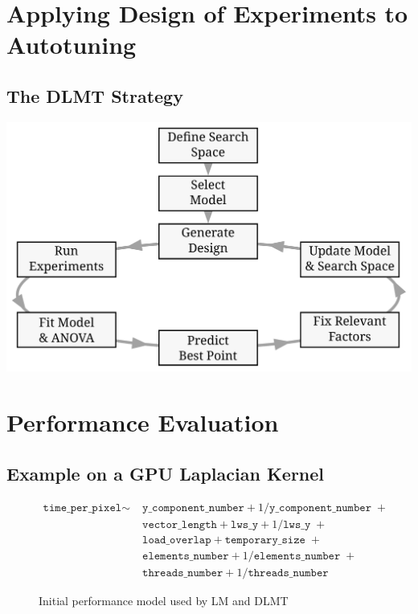 \documentclass[conference]{IEEEtran}
\begin{document}
\section{Applying Design of Experiments to Autotuning}
\label{sec:orgd139c36}
\subsection{The DLMT Strategy}
\label{sec:org52fa62d}
\begin{center}
\begin{center}
\includegraphics[width=.8\columnwidth]{./img/doe_anova_strategy.pdf}
\end{center}
\end{center}
\section{Performance Evaluation}
\label{sec:org8698b22}
\subsection{Example on a GPU Laplacian Kernel}
\label{sec:org827a55c}
\begin{figure}
{\scriptsize
\begin{align*}
\texttt{time\_per\_pixel} \sim & \; \texttt{y\_component\_number} + 1 / \texttt{y\_component\_number} \; + \\
& \; \texttt{vector\_length} + \texttt{lws\_y} + 1 / \texttt{lws\_y} \; + \\
& \; \texttt{load\_overlap} + \texttt{temporary\_size} \; + \\
& \; \texttt{elements\_number} + 1 / \texttt{elements\_number} \; + \\
& \; \texttt{threads\_number} + 1 /\texttt{threads\_number}
\end{align*}
}
\caption{Initial performance model used by LM and DLMT}
\end{figure}
\end{document}

